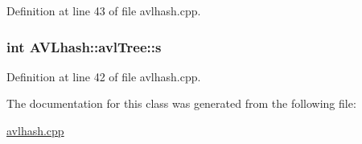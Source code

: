 Definition at line 43 of file avlhash.\-cpp.

\hypertarget{class_a_v_lhash_1_1avl_tree_a98e40b4ee8d489d79db9e2a691bfedbb}{
\subsubsection[{s}]{\setlength{\rightskip}{0pt plus 5cm}int A\-V\-Lhash\-::avl\-Tree\-::s}}\label{class_a_v_lhash_1_1avl_tree_a98e40b4ee8d489d79db9e2a691bfedbb}


Definition at line 42 of file avlhash.\-cpp.



The documentation for this class was generated from the following file\-:\begin{DoxyCompactItemize}
\item 
\hyperlink{avlhash_8cpp}{avlhash.\-cpp}\end{DoxyCompactItemize}
